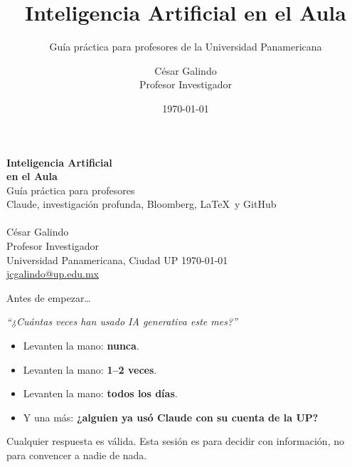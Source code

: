 \documentclass[aspectratio=169,10pt]{beamer}
\title[IA en el aula]{Inteligencia Artificial en el Aula}
\subtitle{Guía práctica para profesores de la Universidad Panamericana}
\author[César Galindo]{César Galindo \\ \footnotesize Profesor Investigador}
\institute[UP]{Universidad Panamericana, Ciudad UP}
\date{\today}
\begin{document}
\begin{frame}[plain]
\begin{center}
\vspace{0.7cm}
{\color{white}\Huge\bfseries Inteligencia Artificial\\[2pt] en el Aula}\\[10pt]
{\color{Gd!90}\Large Guía práctica para profesores}\\[2pt]
{\color{white!85}\large Claude, investigación profunda, Bloomberg, \LaTeX\ y GitHub}\\[18pt]
{\color{white}\faRobot\Large}\\[12pt]
{\color{white}\large César Galindo}\\
{\color{Gd!90}\normalsize Profesor Investigador}\\[2pt]
{\color{Lt}\normalsize Universidad Panamericana, Ciudad UP \quad\textbullet\quad \today}\\[4pt]
{\color{white!70}\small \href{mailto:jcgalindo@up.edu.mx}{jcgalindo@up.edu.mx}}
\end{center}
\end{frame}

\begin{frame}{Antes de empezar\dots}
\begin{center}
\Large\color{Dp}\faHandPaper
\end{center}
\vspace{8pt}
\begin{center}
\large\emph{``¿Cuántas veces han usado IA generativa este mes?''}
\end{center}
\vspace{10pt}
\begin{itemize}
  \item Levanten la mano: \textbf{nunca}.
  \item Levanten la mano: \textbf{1--2 veces}.
  \item Levanten la mano: \textbf{todos los días}.
  \item Y una más: \textbf{¿alguien ya usó Claude con su cuenta de la UP?}
\end{itemize}
\vspace{8pt}
\centering\small Cualquier respuesta es válida. Esta sesión es para decidir con información, no para convencer a nadie de nada.
\end{frame}
\end{document}
